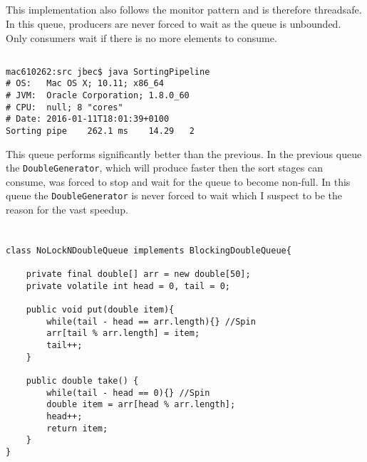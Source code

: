\documentclass{ituhandin}
\begin{document}
\section{}
This implementation also follows the monitor pattern and is therefore threadsafe. In this queue, producers are never forced to wait as the queue is unbounded. Only consumers wait if there is no more elements to consume.
\section{}
\begin{lstlisting}[language={},frame={}]
mac610262:src jbec$ java SortingPipeline
# OS:   Mac OS X; 10.11; x86_64
# JVM:  Oracle Corporation; 1.8.0_60
# CPU:  null; 8 "cores"
# Date: 2016-01-11T18:01:39+0100
Sorting pipe    262.1 ms    14.29   2
\end{lstlisting}

This queue performs significantly better than the previous. In the previous queue the \texttt{DoubleGenerator}, which will produce faster then the sort stages can consume, was forced to stop and wait for the queue to become non-full. In this queue the \texttt{DoubleGenerator} is never forced to wait which I suspect to be the reason for the vast speedup.

\chapter{} %
\section{} %
\begin{lstlisting}[caption= Implementation of the \texttt{UnboundedDoubleQueue} blocking queue]
class NoLockNDoubleQueue implements BlockingDoubleQueue{

    private final double[] arr = new double[50];
    private volatile int head = 0, tail = 0;

    public void put(double item){
        while(tail - head == arr.length){} //Spin
        arr[tail % arr.length] = item;
        tail++;
    }

    public double take() { 
        while(tail - head == 0){} //Spin
        double item = arr[head % arr.length];
        head++;
        return item; 
    }
}
\end{lstlisting}
\section{} %
\end{document}
